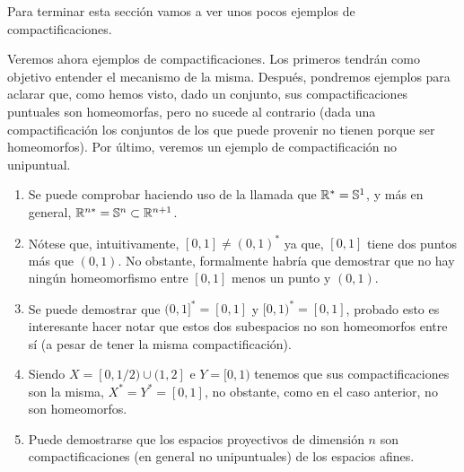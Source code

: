 Para terminar esta sección vamos a ver unos pocos ejemplos de compactificaciones.
\begin{exa}[Miscelánea]
	Veremos ahora ejemplos de compactificaciones. Los primeros tendrán como objetivo entender el mecanismo de la misma. Después, pondremos ejemplos para aclarar que, como hemos visto, dado un conjunto, sus compactificaciones puntuales son homeomorfas, pero no sucede al contrario (dada una compactificación los conjuntos de los que puede provenir no tienen porque ser homeomorfos). Por último, veremos un ejemplo de compactificación no unipuntual. 
	\begin{enumerate}
		\item Se puede comprobar haciendo uso de la llamada  que $\mathbb{R}^*=\mathbb{S}^1$, y más en general, $\mathbb{R}^{n*}=\mathbb{S}^n\subset \mathbb{R}^{n+1}$.
		\item Nótese que, intuitivamente, $[0,1]\not=(0,1)^*$ ya que, $[0,1]$ tiene dos puntos más que $(0,1)$. No obstante, formalmente habría que demostrar que no hay ningún homeomorfismo entre $[0,1]$ menos un punto y $(0,1)$.
		\item Se puede demostrar que $(0,1]^*=[0,1]$ y $[0,1)^*=[0,1]$, probado esto es interesante hacer notar que estos dos subespacios no son homeomorfos entre sí (a pesar de tener la misma compactificación).
		\item Siendo $X=[0,1/2)\cup(1,2]$ e $Y=[0,1)$ tenemos que sus compactificaciones son la misma, $X^*=Y^*=[0,1]$, no obstante, como en el caso anterior, no son homeomorfos.
		\item Puede demostrarse que los espacios proyectivos de dimensión $n$ son compactificaciones (en general no unipuntuales) de los espacios afines.\qedhere
	\end{enumerate}
\end{exa}

